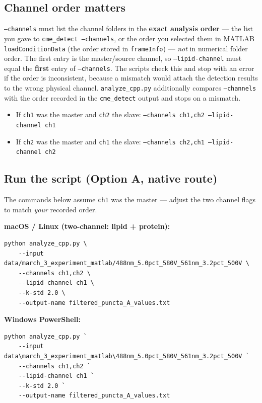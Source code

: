 \documentclass[11pt]{article}
\newcommand{\code}[1]{\texttt{#1}}
\begin{document}
\subsection*{Channel order matters}

\code{--channels} must list the channel folders in the \textbf{exact
analysis order} --- the list you gave to \code{cme\_detect --channels},
or the order you selected them in MATLAB \code{loadConditionData} (the
order stored in \code{frameInfo}) --- \emph{not} in numerical folder
order. The first entry is the master/source channel, so
\code{--lipid-channel} must equal the \textbf{first} entry of
\code{--channels}. The scripts check this and stop with an error if
the order is inconsistent, because a mismatch would attach the
detection results to the wrong physical channel.
\code{analyze\_cpp.py} additionally compares \code{--channels} with
the order recorded in the \code{cme\_detect} output and stops on a
mismatch.

\begin{itemize}[leftmargin=*]
    \item If \code{ch1} was the master and \code{ch2} the slave:
    \code{--channels ch1,ch2 --lipid-channel ch1}
    \item If \code{ch2} was the master and \code{ch1} the slave:
    \code{--channels ch2,ch1 --lipid-channel ch2}
\end{itemize}

\subsection*{Run the script (Option A, native route)}

The commands below assume \code{ch1} was the master --- adjust the two
channel flags to match \emph{your} recorded order.

\textbf{macOS / Linux (two-channel: lipid + protein):}

\begin{lstlisting}
python analyze_cpp.py \
    --input data/march_3_experiment_matlab/488nm_5.0pct_580V_561nm_3.2pct_500V \
    --channels ch1,ch2 \
    --lipid-channel ch1 \
    --k-std 2.0 \
    --output-name filtered_puncta_A_values.txt
\end{lstlisting}

\textbf{Windows PowerShell:}

\begin{lstlisting}
python analyze_cpp.py `
    --input data\march_3_experiment_matlab\488nm_5.0pct_580V_561nm_3.2pct_500V `
    --channels ch1,ch2 `
    --lipid-channel ch1 `
    --k-std 2.0 `
    --output-name filtered_puncta_A_values.txt
\end{lstlisting}
\end{document}
